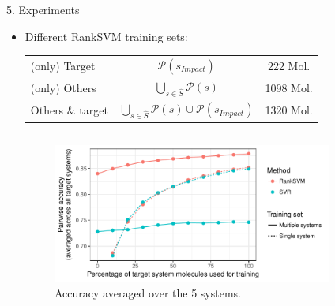 \documentclass{beamer}
\newcommand{\sys}{s}
\newcommand{\Pref}{\mathcal{P}}
\begin{document}
\begin{frame}{}
\begin{columns}[T]
\begin{column}{.52\linewidth}
\begin{block}       {{\normalsize 5. Experiments}}
\begin{itemize}
                    \item Different RankSVM training sets:
\begin{small}
\begin{tabular}{l|c|c}
                    \toprule
                    (only) Target & $\Pref(\sys_{Impact})$ & 222 Mol.\\
                    (only) Others & $\bigcup_{\sys \in \hat{S}} \Pref(s)$ & 1098 Mol.\\
                    Others \& target & $\bigcup_{\sys \in \hat{S}} \Pref(s) \cup \Pref(\sys_{Impact})$ & 1320 Mol.\\
                    \bottomrule
\end{tabular}
\end{small}                      
%                  
\end{itemize}                    
\begin{columns}
\begin{column}{.01\linewidth}
\end{column}
\begin{column}{.49\linewidth}
\begin{figure}
                    \centering
                    \includegraphics[width=\textwidth]{images/pwacc_avg_across_systems_all_on_one_perc_2.pdf}
                    \caption{Accuracy averaged over the 5 systems.}
                    \label{fig:all_on_one_vs_baseline}
\end{figure}
\end{column}
\begin{column}{.49\linewidth}
\begin{figure}
                    \centering

\end{figure}
\end{column}
\end{columns}
\end{block}
\end{column}
\end{columns}
\end{frame}
\end{document}
